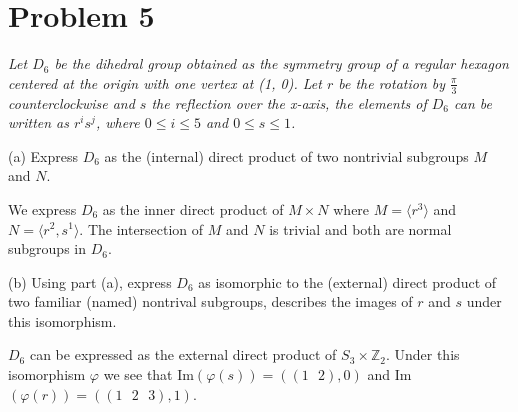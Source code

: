 \documentclass{article}
\theoremstyle{plain} %
\theoremstyle{definition} %
\begin{document}
\section*{Problem 5}
\noindent\textit{Let $D_6$ be the dihedral group obtained as the symmetry
group of a regular hexagon centered at the origin with one vertex at (1, 0).
Let $r$ be the rotation by $\frac{\pi}{3}$ counterclockwise and $s$ the reflection 
over the x-axis, the elements of $D_6$ can be written as $r^is^j$, where
$0 \leq i \leq 5$ and $0 \leq s \leq 1$.}

\noindent(a) Express $D_6$ as the (internal) direct product of two nontrivial
subgroups $M$ and $N$.

We express $D_6$ as the inner direct product of $M \times N$ where $M = 
\langle r^3 \rangle$ and $N = \langle r^2, s^1\rangle$. The intersection
of $M$ and $N$ is trivial and both are normal subgroups in $D_6$.

\noindent(b) Using part (a), express $D_6$ as isomorphic to the (external) direct
product of two familiar (named) nontrival subgroups, describes the images
of $r$ and $s$ under this isomorphism.

$D_6$ can be expressed as the external direct product of $S_3 \times \mathbb{Z}_2$.
Under this isomorphism $\varphi$ we see that Im$(\varphi(s)) = ((1\text{ }2),0)$ and
Im$(\varphi(r)) = ((1\text{ }2\text{ }3),1)$.
\end{document}
